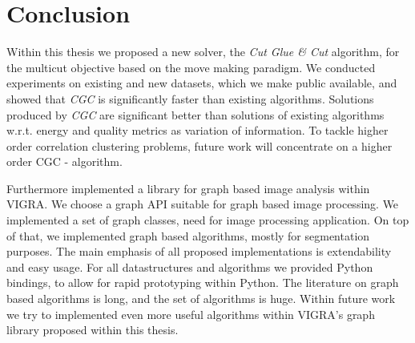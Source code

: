 \chapter{Conclusion}\label{ch:conclusion}

Within this thesis we proposed
a new solver, the \emph{Cut Glue \& Cut} algorithm, for the multicut objective
based on the move making paradigm.
We conducted experiments on existing 
and new datasets, which we make public available,
and showed that \emph{CGC}
is significantly faster than existing 
algorithms.
Solutions produced by \emph{CGC} are significant
better than solutions of existing  algorithms w.r.t. energy
and quality metrics as variation of information.
To tackle higher order correlation clustering problems,
future work will concentrate on a higher order CGC - algorithm.


Furthermore implemented a library
for graph based image analysis within VIGRA.
We choose a graph API suitable for graph
based image processing.
We implemented a set of graph classes, 
need for image processing application.
On top of that, we implemented 
graph based algorithms, mostly for
segmentation purposes.
The main emphasis of all proposed
implementations is extendability and easy usage.
For all datastructures and
algorithms we provided Python bindings,
to allow for rapid prototyping 
within Python.
The literature on graph based
algorithms is long, and the set of
algorithms is huge.
Within future work we try to implemented
even  more useful algorithms within
VIGRA's graph library proposed within this thesis. 

